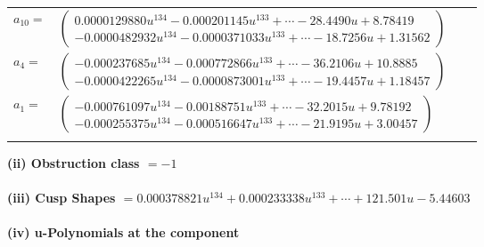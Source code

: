 \documentclass[1p]{elsarticle_modified}
\theoremstyle{definition}
\begin{document}
\begin{tabular}{m{7pt} m{180pt} m{7pt} m{180pt} }
\flushright $a_{10}=$&$\begin{pmatrix}0.0000129880 u^{134}-0.000201145 u^{133}+\cdots-28.4490 u+8.78419\\-0.0000482932 u^{134}-0.0000371033 u^{133}+\cdots-18.7256 u+1.31562\end{pmatrix}$ \\
\flushright $a_{4}=$&$\begin{pmatrix}-0.000237685 u^{134}-0.000772866 u^{133}+\cdots-36.2106 u+10.8885\\-0.0000422265 u^{134}-0.0000873001 u^{133}+\cdots-19.4457 u+1.18457\end{pmatrix}$ \\
\flushright $a_{1}=$&$\begin{pmatrix}-0.000761097 u^{134}-0.00188751 u^{133}+\cdots-32.2015 u+9.78192\\-0.000255375 u^{134}-0.000516647 u^{133}+\cdots-21.9195 u+3.00457\end{pmatrix}$\\&\end{tabular}
\flushleft \textbf{(ii) Obstruction class $= -1$}\\~\\
\flushleft \textbf{(iii) Cusp Shapes $= 0.000378821 u^{134}+0.000233338 u^{133}+\cdots+121.501 u-5.44603$}\\~\\
\newpage\renewcommand{\arraystretch}{1}
\flushleft \textbf{(iv) u-Polynomials at the component}\newline \\
\end{document}
